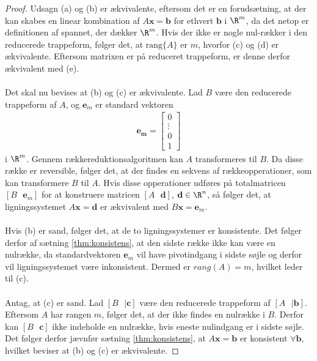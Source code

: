 \begin{proof}
%
Udsagn (a) og (b) er ækvivalente, eftersom det er en forudsætning, at der kan skabes en linear kombination af $A\mathbf{x} =\mathbf{b}$ for ethvert $\mathbf{b}$ i $\R^m$, da det netop er definitionen af spannet, der dækker $\R^m$. 
%
Hvis der ikke er nogle nul-rækker i den reducerede trappeform, følger det, at $\text{rang}\{A\}$ er $m$, hvorfor (c) og (d) er ækvivalente. 
Eftersom matrixen er på reduceret trappeform, er denne derfor ækvivalent med (e).
\\\\
Det skal nu bevises at (b) og (c) er ækvivalente. 
Lad $B$ være den reducerede trappeform af $A$, og $\mathbf{e}_m$ er standard vektoren
%
\begin{align*}
\mathbf{\mathbf{e}_m} = \begin{bmatrix}
		0 \\
        \vdots \\
        0 \\
        1 
\end{bmatrix}
\end{align*}
%
i $\R^m$. 
Gennem rækkereduktionsalgoritmen kan $A$ transformeres til $B$. 
Da disse række er reversible, følger det, at der findes en sekvens af rækkeopperationer, som kan transformere $B$ til $A$.
Hvis disse opperationer udføres på totalmatricen 
$[B \text{    } \mathbf{e}_m]$ 
for at konstruere matricen 
$[A \text{    } \mathbf{d}]$, 
$\mathbf{d} \in \R^n$, 
så følger det, at ligningssystemet $A\mathbf{x}=\mathbf{
d}$ er ækvivalent med $B\mathbf{x}=\mathbf{e}_m$.
\\\\
Hvis (b) er sand, følger det, at de to ligningssystemer er konsistente. 
Det følger derfor af sætning \ref{thm:konsistens}, at den sidste række ikke kan være en nulrække, da standardvektoren $\mathbf{e}_m$ vil have pivotindgang i sidste søjle og derfor vil ligningssystemet være inkonsistent.
Dermed er $rang(A)=m$, hvilket leder til (c).
\\\\
Antag, at (c) er sand. 
Lad $[B \text{    }| \mathbf{c}]$ 
være den reducerede trappeform af 
$[A \text{    } | \mathbf{b}]$.
Eftersom $A$ har rangen $m$, følger det, at der ikke findes en nulrække i $B$.
Derfor kan $[B \text{    } \mathbf{c}]$ ikke indeholde en nulrække, hvis eneste nulindgang er i sidste søjle. 
Det følger derfor jævnfør sætning \ref{thm:konsistens}, at $A\mathbf{x}=\mathbf{b}$ er konsistent $\forall \mathbf{b}$, hvilket beviser at (b) og (c) er ækvivalente.
%
\end{proof}
